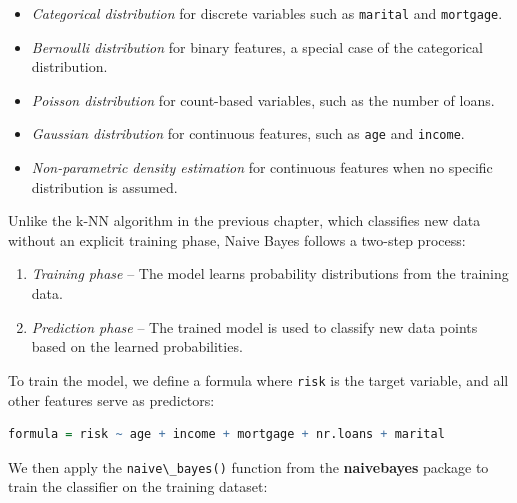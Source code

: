 \documentclass[
  11pt,
]{book}
\newcommand{\passthrough}[1]{#1}
\providecommand{\tightlist}{%
  \setlength{\itemsep}{0pt}\setlength{\parskip}{0pt}}
\theoremstyle{definition}
\theoremstyle{definition}
\theoremstyle{definition}
\theoremstyle{definition}
\theoremstyle{remark}
\begin{document}
\begin{itemize}
\tightlist
\item
  \emph{Categorical distribution} for discrete variables such as \passthrough{\lstinline!marital!} and \passthrough{\lstinline!mortgage!}.\\
\item
  \emph{Bernoulli distribution} for binary features, a special case of the categorical distribution.\\
\item
  \emph{Poisson distribution} for count-based variables, such as the number of loans.\\
\item
  \emph{Gaussian distribution} for continuous features, such as \passthrough{\lstinline!age!} and \passthrough{\lstinline!income!}.\\
\item
  \emph{Non-parametric density estimation} for continuous features when no specific distribution is assumed.
\end{itemize}

Unlike the k-NN algorithm in the previous chapter, which classifies new data without an explicit training phase, Naive Bayes follows a two-step process:

\begin{enumerate}
\def\labelenumi{\arabic{enumi}.}
\tightlist
\item
  \emph{Training phase} -- The model learns probability distributions from the training data.\\
\item
  \emph{Prediction phase} -- The trained model is used to classify new data points based on the learned probabilities.
\end{enumerate}

To train the model, we define a formula where \passthrough{\lstinline!risk!} is the target variable, and all other features serve as predictors:

\begin{lstlisting}[language=R]
formula = risk ~ age + income + mortgage + nr.loans + marital
\end{lstlisting}

We then apply the \passthrough{\lstinline!naive\_bayes()!} function from the \textbf{naivebayes} package to train the classifier on the training dataset:
\end{document}
